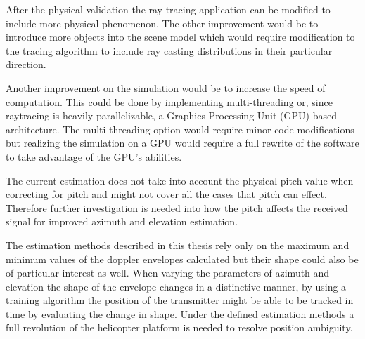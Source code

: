 After the physical validation the ray tracing application can be modified to include more physical phenomenon. The other improvement would be to introduce more objects into the scene model which would require modification to the tracing algorithm to include ray casting distributions in their particular direction.

Another improvement on the simulation would be to increase the speed of computation. This could be done by implementing multi-threading or, since raytracing is heavily parallelizable, a Graphics Processing Unit (GPU) based architecture. The multi-threading option would require minor code modifications but realizing the simulation on a GPU would require a full rewrite of the software to take advantage of the GPU's abilities. 

The current estimation does not take into account the physical pitch value when correcting for pitch and might not cover all the cases that pitch can effect. Therefore further investigation is needed into how the pitch affects the received signal for improved azimuth and elevation estimation.

The estimation methods described in this thesis rely only on the maximum and minimum values of the doppler envelopes calculated but their shape could also be of particular interest as well. When varying the parameters of azimuth and elevation the shape of the envelope changes in a distinctive manner, by using a training algorithm the position of the transmitter might be able to be tracked in time by evaluating the change in shape. Under the defined estimation methods a full revolution of the helicopter platform is needed to resolve position ambiguity.
 
